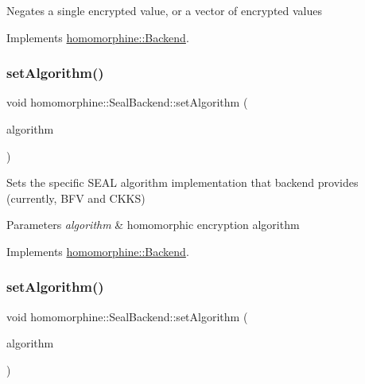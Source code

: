Negates a single encrypted value, or a vector of encrypted values 

Implements \mbox{\hyperlink{classhomomorphine_1_1_backend_ab0064461260713ce7a9f660b5f6dc5af}{homomorphine\+::\+Backend}}.

\mbox{\label{classhomomorphine_1_1_seal_backend_a46a336bca80c5450a1f3ea1125d0d0e8}} 
\subsubsection{\texorpdfstring{setAlgorithm()}{setAlgorithm()}\hspace{0.1cm}{\footnotesize\ttfamily [1/2]}}
{\footnotesize\ttfamily void homomorphine\+::\+Seal\+Backend\+::set\+Algorithm (\begin{DoxyParamCaption}\item[{string}]{algorithm }\end{DoxyParamCaption})\hspace{0.3cm}{\ttfamily [virtual]}}

Sets the specific S\+E\+AL algorithm implementation that backend provides (currently, B\+FV and C\+K\+KS)


\begin{DoxyParams}{Parameters}
{\em algorithm} & homomorphic encryption algorithm \\
\hline
\end{DoxyParams}


Implements \mbox{\hyperlink{classhomomorphine_1_1_backend_a69cc49ddff047e257a7d793ac240b08b}{homomorphine\+::\+Backend}}.

\mbox{\label{classhomomorphine_1_1_seal_backend_a6fe83c3f4e6610888e2cf4c6b9717ede}} 
\subsubsection{\texorpdfstring{setAlgorithm()}{setAlgorithm()}\hspace{0.1cm}{\footnotesize\ttfamily [2/2]}}
{\footnotesize\ttfamily void homomorphine\+::\+Seal\+Backend\+::set\+Algorithm (\begin{DoxyParamCaption}\item[{Seal\+Algorithm\+Type}]{algorithm }\end{DoxyParamCaption})}

